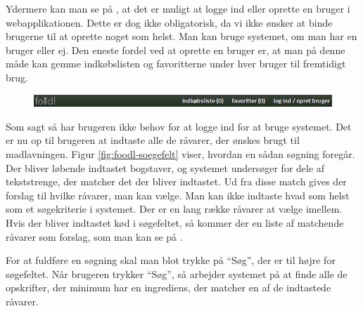 Ydermere kan man se på , at det er muligt at logge ind eller oprette en bruger i webapplikationen. Dette er dog ikke obligatorisk, da vi ikke ønsker at binde brugerne til at oprette noget som helst. Man kan bruge systemet, om man har en bruger eller ej. Den eneste fordel ved at oprette en bruger er, at man på denne måde kan gemme indkøbslisten og favoritterne under hver bruger til fremtidigt brug.

\begin{figure}[H]
	\centering
	\includegraphics[scale=0.7]{billeder/foodl/header.jpg}
	\label{fig:foodl-header}
\end{figure}

Som sagt så har brugeren ikke behov for at logge ind for at bruge systemet. Det er nu op til brugeren at indtaste alle de råvarer, der ønskes brugt til madlavningen. Figur \ref{fig:foodl-soegefelt} viser, hvordan en sådan søgning foregår. Der bliver løbende indtastet bogstaver, og systemet undersøger for dele af tekststrenge, der matcher det der bliver indtastet. Ud fra disse match gives der forslag til hvilke råvarer, man kan vælge. Man kan ikke indtaste hvad som helst som et søgekriterie i systemet. Der er en lang række råvarer at vælge imellem. Hvis der \fx bliver indtastet kød i søgefeltet, så kommer der en liste af matchende råvarer som forslag, som man kan se på .

For at fuldføre en søgning skal man blot trykke på ``Søg'', der er til højre for søgefeltet. Når brugeren trykker ``Søg'', så arbejder systemet på at finde alle de opskrifter, der minimum har en ingrediens, der matcher en af de indtastede råvarer.

